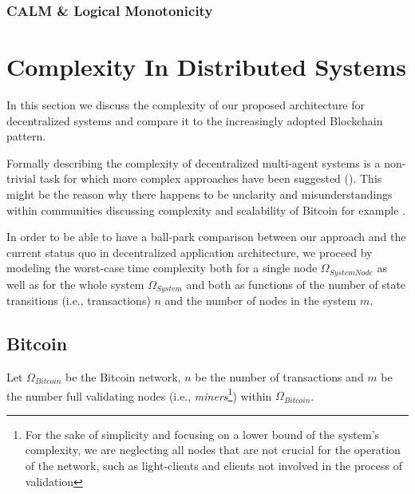 \documentclass[twocolumn,showpacs,%
  nofootinbib,aps,superscriptaddress,%
  eqsecnum,prd,notitlepage,showkeys,10pt]{revtex4-1}
\begin{document}
\subsubsection{CALM \& Logical Monotonicity}


\section{Complexity In Distributed Systems}
\label{sec:complexity}

In this section we discuss the complexity of our proposed architecture for decentralized systems and compare it to the increasingly adopted Blockchain pattern.

Formally describing the complexity of decentralized multi-agent systems is a non-trivial task for which more complex approaches have been suggested (\cite{multi-agent-complex}).
This might be the reason why there happens to be unclarity and misunderstandings within communities discussing complexity and scalability of Bitcoin for example {\cite{bitcoin-complex}}.

In order to be able to have a ball-park comparison between our approach and the current status quo in decentralized application architecture, we proceed by modeling the worst-case time complexity both for a single node $\Omega_{SystemNode}$ as well as for the whole system $\Omega_{System}$ and both as functions of the number of state transitions (i.e., transactions) $n$ and the number of nodes in the system $m$.

\subsection{Bitcoin}
Let $\Omega_{Bitcoin}$ be the Bitcoin network, $n$ be the number of transactions and $m$ be the number full validating nodes (i.e., \textit{miners}\footnote{For the sake of simplicity and focusing on a lower bound of the system's complexity, we are neglecting all nodes that are not crucial for the operation of the network, such as light-clients and clients not involved in the process of validation}) within $\Omega_{Bitcoin}$.
\end{document}
